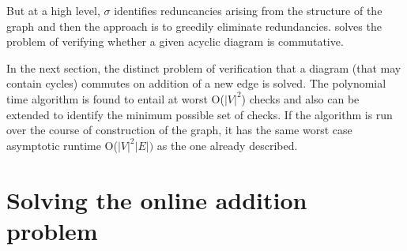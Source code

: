 \documentclass{article}
\begin{document}
But at a high level, $\sigma$ identifies reduncancies arising from the structure of the graph and then the approach is to greedily eliminate redundancies.
\cite{commutative} solves the problem of verifying whether a given acyclic diagram is commutative.

In the next section, the distinct problem of verification that a diagram (that may contain cycles) commutes on addition of a new edge is solved. The polynomial time algorithm is found to entail at worst O($|V|^2$) checks and also can be extended to identify the minimum possible set of checks. If the algorithm is run over the course of construction of the graph, it has the same worst case asymptotic runtime O($|V|^2|E|)$ as the one already described.

\section{Solving the online addition problem}
\end{document}
